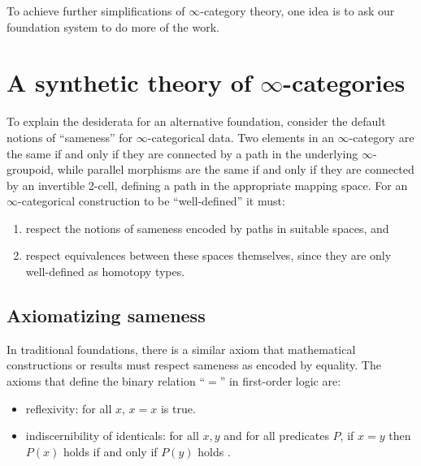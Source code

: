 \documentclass[11pt]{ctexart}
\theoremstyle{definition}
\theoremstyle{remark}
\numberwithin{equation}{section}
\newcommand{\1}{\mathbbe{1}}
\newcommand{\2}{\mathbbe{2}}
\newcommand{\3}{\mathbbe{3}}
\begin{document}
To achieve further simplifications of $\infty$-category theory, one idea is to ask our foundation system to do more of the work.

\section{A synthetic theory of \texorpdfstring{$\infty$}{infinity}-categories}\label{sec:synthetic}

To explain the desiderata for an alternative foundation, consider the default notions of ``sameness'' for $\infty$-categorical data. Two elements in an $\infty$-category are the same if and only if they are connected by a path in the underlying $\infty$-groupoid, while parallel morphisms are the same if and only if they are connected by an invertible 2-cell, defining a path in the appropriate mapping space. For an $\infty$-categorical construction to be ``well-defined'' it must:
\begin{enumerate}
    \item respect the notions of sameness encoded by paths in suitable spaces, and 
    \item respect equivalences between these spaces themselves, since they are only well-defined as homotopy types.
\end{enumerate} 

\subsection*{Axiomatizing sameness}

In traditional foundations, there is a similar axiom that mathematical constructions or results must respect sameness as encoded by equality. The axioms that define the binary relation ``$=$'' in first-order logic are:
\begin{itemize}
    \item reflexivity: for all $x$, $x=x$ is true.
    \item indiscernibility of identicals: for all $x,y$ and for all predicates $P$, if $x=y$ then $P(x)$ holds if and only if $P(y)$ holds \cite{leibniz}. 
\end{itemize} 
\end{document}

